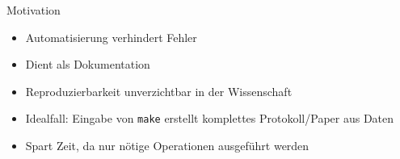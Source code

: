\begin{frame}{Motivation}
  \begin{itemize}
    \item Automatisierung verhindert Fehler
    \item Dient als Dokumentation
    \item Reproduzierbarkeit unverzichtbar in der Wissenschaft
    \item Idealfall: Eingabe von \texttt{make} erstellt komplettes Protokoll/Paper aus Daten
    \item Spart Zeit, da nur nötige Operationen ausgeführt werden
  \end{itemize}
\end{frame}
